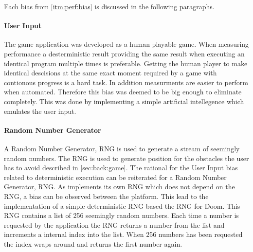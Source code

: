 Each bias from \autoref{itm:perf:bias} is discussed in the following paragraphs.

\paragraph{User Input} The game application was developed as a human playable game.
When measuring performance a desterministic result providing the same result when executing an identical program multiple times is preferable.
Getting the human player to make identical descisions at the same exact moment required by a game with contionous progress is a hard task.
In addition measurments are easier to perform when automated.
Therefore this bias was deemed to be big enough to eliminate completely.
This was done by implementing a simple artificial intellegence which emulates the user input.

\paragraph{Random Number Generator}
A Random Number Generator, RNG is used to generate a stream of seemingly random numbers.
The RNG is used to generate position for the obstacles the user has to avoid described in \autoref{sec:back:game}.
The rational for the User Input bias related to deterministic execution can be reiterated for a Random Number Generator, RNG.
As {\rust} implements its own RNG which does not depend on the {\C} RNG, a bias can be observed between the platform.
This lead to the implementation of a simple deterministic RNG based the RNG for Doom.
This RNG contains a list of 256 seemingly random numbers.
Each time a number is requested by the application the RNG returns a number from the list and increments a internal index into the list.
When 256 numbers has been requested the index wraps around and returns the first number again.

